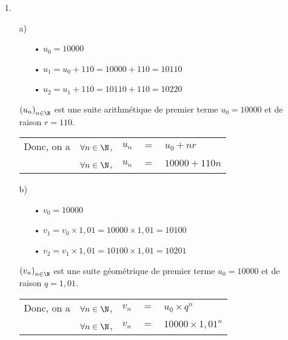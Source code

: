 \vspace*{.3cm}

\begin{itemize}
\item[1.]
\begin{itemize}
\item[a)] 
\begin{itemize}
\item[•] $u_0 = 10 000$ \\
\item[•] $u_1 = u_0 + 110 = 10 000 + 110 = 10110$ \\
\item[•] $u_2 = u_1 + 110 = 10110 + 110 = 10220$ \\
\end{itemize}
\vspace*{.3cm}
$\left(u_n\right)_{n \in \N}$ est une suite arithmétique de premier terme $u_0 = 10 000$ et de raison $r = 110$. \\

\begin{tabular}{lllll}
Donc, on a & $\forall n \in \N$, & $ u_n $ & $ = $ &$ u_0 + nr$ \\
& $\forall n \in \N$, & $u_n $ & $=$ & $10 000 + 110n$ \vspace*{.3cm} \\
\end{tabular}
\item[b)] 
\begin{itemize}
\item[•] $v_0 = 10 000$ \\
\item[•] $v_1 = v_0 \times 1,01 = 10 000 \times 1,01 = 10100$ \\
\item[•] $v_2 = v_1 \times 1,01 = 10 100 \times 1,01 = 10201$ \\
\end{itemize}
\vspace*{.3cm}
$\left(v_n\right)_{n \in \N}$ est une suite géométrique de premier terme $u_0 = 10 000$ et de raison $q = 1,01$. \\

\begin{tabular}{lllll}
Donc, on a & $\forall n \in \N$, & $ v_n $ & $ = $ &$ u_0 \times q^n$ \\
& $\forall n \in \N$, & $v_n $ & $=$ & $10 000 \times 1,01^n$ \vspace*{.3cm} \\
\end{tabular}
\end{itemize}
\end{itemize}

